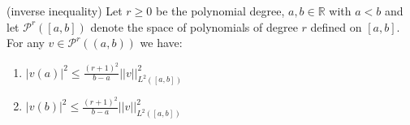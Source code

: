 \begin{lemma}
    {\normalfont(inverse inequality)} Let $r\geq 0$ be the polynomial degree, 
    $a,b\in \mathbb{R}$ with $a<b$ and let $\mathcal{P}^r([a,b])$ denote the 
    space of polynomials of degree $r$ defined on $[a,b]$. \\
    For any $v\in \mathcal{P}^r((a,b))$ we have:
    \begin{enumerate}
        \item $|v(a)|^2 \leq \frac{{(r+1)}^2}{b-a}||v||_{L^2([a,b])}^2$ 
        \item $|v(b)|^2 \leq \frac{{(r+1)}^2}{b-a}||v||_{L^2([a,b])}^2$
    \end{enumerate}
\end{lemma}



